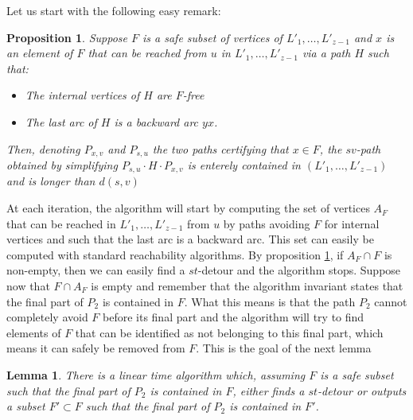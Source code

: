 \documentclass[utf8,11pt]{article}
\theoremstyle{plain}
\newtheorem{lemma}[theorem]{Lemma}
\newtheorem{proposition}[theorem]{Proposition}
\theoremstyle{definition}
\begin{document}
Let us start with the following easy remark:

\begin{proposition}\label{pro:F}
   Suppose $F$ is a safe subset of vertices of $L'_1, \dots, L'_{z-1}$ and $x$ is an element of $F$ that can be reached from $u$ in $L'_1, \dots, L'_{z-1}$ via a path $H$ such that: 
   \begin{itemize}
    \item The internal vertices of $H$ are $F$-free
    \item The last arc of $H$ is a backward arc $yx$.
   \end{itemize}
   Then, denoting $P_{x,v}$ and $P_{s,u}$ the two paths certifying that $x \in F$, the $sv$-path obtained by simplifying $P_{s,u} \cdot H \cdot P_{x,v}$ is enterely contained in $(L'_1, \dots, L'_{z-1})$ and is longer than $d(s,v)$
\end{proposition}



At each iteration, the algorithm will start by computing the set of vertices $A_F$ that can be reached in $L'_1, \dots, L'_{z-1}$ from $u$ by paths avoiding $F$ for internal vertices and such that the last arc is a backward arc. This set can easily be computed with standard reachability algorithms. By proposition \ref{pro:F}, if $A_F \cap F$ is non-empty, then we can easily find a $st$-detour and the algorithm stops. Suppose now that $F \cap A_F$ is empty and remember that the algorithm invariant states that the final part of $P_2$ is contained in $F$. What this means is that the path $P_2$ cannot completely avoid $F$ before its final part and the algorithm will try to find elements of $F$ that can be identified as not belonging to this final part, which means it can safely be removed from $F$. This is the goal of the next lemma


\begin{lemma}
    There is a linear time algorithm which, assuming $F$ is a safe subset such that the final part of $P_2$ is contained in $F$, either finds a $st$-detour or outputs a subset $F' \subset F$ such that the final part of $P_2$ is contained in $F'$.
\end{lemma}
\end{document}
